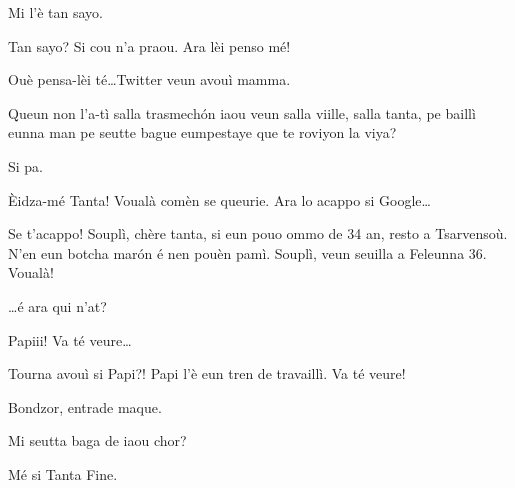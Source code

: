 \begin{drama}
\Alicespeaks Mi l'è tan sayo.

\Tanteunspeaks Tan sayo? Si cou n'a praou. Ara lèi penso mé!


\Alicespeaks Ouè pensa-lèi té\ldots Twitter veun avouì mamma.

\Tanteunspeaks Queun non l'a-tì salla trasmech\'on iaou veun salla viille, salla tanta, pe baillì eunna man pe seutte  bague eumpestaye que te roviyon la viya?

\Alicespeaks Si pa.

\Tanteunspeaks \og \`Eidza-mé Tanta\fg! Voualà comèn se queurie. Ara lo acappo si Google\ldots


\Tanteunspeaks{} Se t'acappo!  \og Souplì, chère tanta, si eun pouo ommo de 34 an, resto a Tsarvensoù. N'en eun botcha mar\'on é nen pouèn pamì. Souplì, veun seuilla a Feleunna 36\fg. Voualà! 




\Tanteunspeaks \ldots é ara qui n'at?

\Alicespeaks Papiii! Va té veure\ldots

\Tanteunspeaks Tourna avouì si Papi?! Papi l'è eun tren de travaillì. Va té veure!


\Alicespeaks{} Bondzor, entrade maque.


\label{tata}


\Tanteunspeaks{} Mi seutta baga de iaou chor?

\Tantaspeaks{} Mé si Tanta Fine.


\end{drama}
